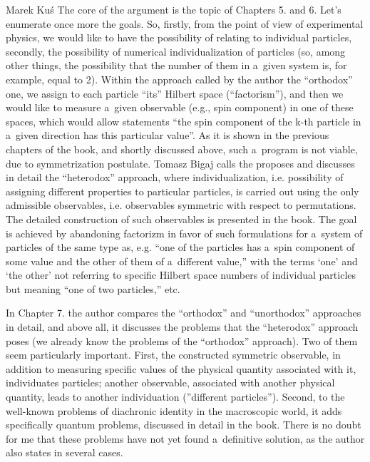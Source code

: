\begin{newrevengenv}{Marek Kuś}
The core of the argument is the topic of Chapters 5. and 6. Let's enumerate once more the goals. So, firstly, from the point of view of experimental physics, we would like to have the possibility of relating to individual particles, secondly, the possibility of numerical individualization of particles (so, among other things, the possibility that the number of them in a~given system is, for example, equal to 2). Within the approach called by the author the ``orthodox'' one, we assign to each particle ``its'' Hilbert space (``factorism''), and then we would like to measure a~given observable (e.g., spin component) in one of these spaces, which would allow statements ``the spin component of the k-th particle in a~given direction has this particular value''. As it is shown in the previous chapters of the book, and shortly discussed above, such a~program is not viable, due to symmetrization postulate. Tomasz Bigaj calls the proposes and discusses in detail the ``heterodox'' approach, where individualization, i.e. possibility of assigning different properties to particular particles, is carried out using the only admissible observables, i.e. observables symmetric with respect to permutations. The detailed construction of such observables is presented in the book. The goal is achieved by abandoning factorizm in favor of such formulations for a~system of particles of the same type as, e.g. ``one of the particles has a~spin component of some value and the other of them of a~different value,'' with the terms ‘one' and ‘the other' not referring to specific Hilbert space numbers of individual particles but meaning ``one of two particles,'' etc.

In Chapter 7. the author compares the ``orthodox'' and ``unorthodox'' approaches in detail, and above all, it discusses the problems that the ``heterodox'' approach poses (we already know the problems of the ``orthodox'' approach). Two of them seem particularly important. First, the constructed symmetric observable, in addition to measuring specific values of the physical quantity associated with it, individuates particles; another observable, associated with another physical quantity, leads to another individuation (''different particles''). Second, to the well-known problems of diachronic identity in the macroscopic world, it adds specifically quantum problems, discussed in detail in the book. There is no doubt for me that these problems have not yet found a~definitive solution, as the author also states in several cases.


\end{newrevengenv}

